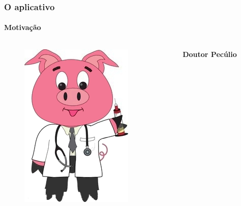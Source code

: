 \documentclass[14pt,beamer]{beamer}
\begin{document}
\begin{frame}
	\frametitle{O aplicativo}
    \framesubtitle{Motivação}
	
	\vspace{-30px}
	\begin{columns}
		\begin{column}{.3\textwidth}
			\begin{figure}
				\includegraphics[scale=.15]{imagens/docpig}
			\end{figure}
		\end{column}%
		\hfill%
		\begin{column}{9\textwidth}
			\large{\textbf{Doutor Pecúlio}}
		\end{column}%
	\end{columns}


\end{frame}
\end{document}
